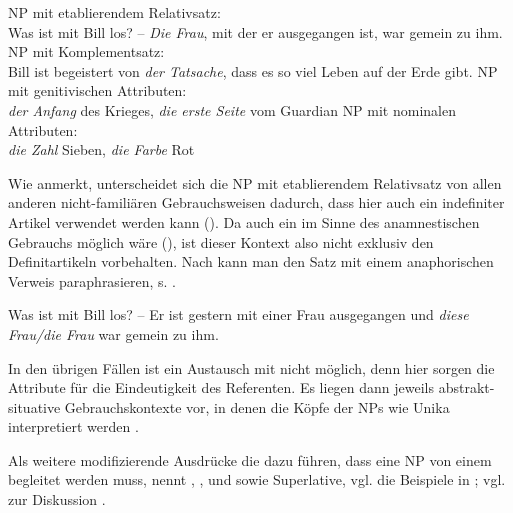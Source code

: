 \begin{exe} 
     \ex
     \begin{xlist}
 		\ex \label{etab} NP  mit etablierendem Relativsatz: \\ Was ist mit Bill los? -- \textit{Die Frau}, mit der er ausgegangen ist, war gemein zu ihm. 
		\ex \label{komp} NP  mit Komplementsatz: \\ Bill ist begeistert von \textit{der Tatsache}, dass es so viel Leben auf der Erde gibt. 
		\ex \label{gen-attr} NP  mit  genitivischen Attributen: \\ \textit{der Anfang} des Krieges, \textit{die erste Seite} vom Guardian
		\ex \label{n-attr} NP  mit nominalen Attributen: \\ \textit{die Zahl} Sieben, \textit{die Farbe} Rot
    \end{xlist}
\end{exe}

Wie \textcite[38]{Himmelmann1997} anmerkt, unterscheidet sich die NP  mit etablierendem Relativsatz von allen anderen nicht-familiären Gebrauchsweisen dadurch, dass hier auch ein indefiniter Artikel  verwendet werden kann (). Da auch ein  im Sinne des anamnestischen  Gebrauchs möglich wäre (), ist dieser Kontext also nicht exklusiv den Definitartikeln vorbehalten. Nach \textcite[308]{Lobner1985} kann man den Satz mit einem anaphorischen  Verweis paraphrasieren, s. . %

\begin{exe}
	\ex \label{ex:bill} Was ist mit Bill los? -- Er ist gestern mit einer Frau ausgegangen und \textit{diese Frau/die Frau} war gemein zu ihm. 
\end{exe}

In den übrigen Fällen ist ein Austausch mit  nicht möglich, denn hier sorgen die Attribute für die Eindeutigkeit des Referenten. Es liegen dann jeweils abstrakt-situative  Gebrauchskontexte vor, in denen die Köpfe der NPs  wie Unika  interpretiert werden  \parencite[38]{Himmelmann1997}. 

Als weitere modifizierende Ausdrücke die dazu führen, dass eine NP  von einem  begleitet werden muss, nennt  \textcite[148 und 228--230]{Hawkins1978} , ,  und  sowie  Superlative, vgl. die Beispiele in ; vgl. zur Diskussion \textcite[9]{Lyons1999}.


